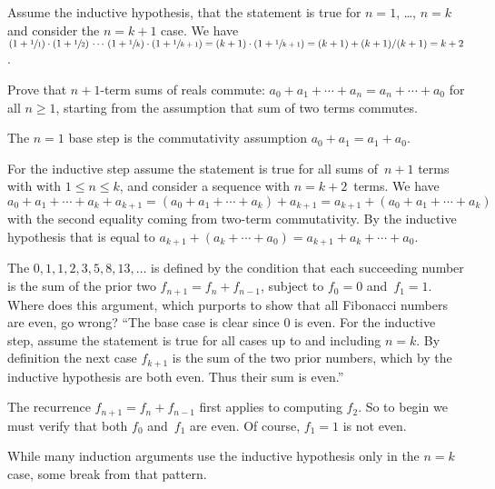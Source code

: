 \documentclass{ibl}  %
\begin{document}
\begin{problem}
\begin{exes}
\begin{answer}
  Assume the inductive hypothesis, that the statement is true for
  $n=1$, \ldots, $n=k$ and consider the $n=k+1$ case.
  We have
  $(1+\sfrac{1}{1})\cdot(1+\sfrac{1}{2})\,\cdots\,(1+\sfrac{1}{k})\cdot(1+\sfrac{1}{k+1})
  =
  (k+1)\cdot(1+\sfrac{1}{k+1})
  =(k+1)+(k+1)/(k+1)
  =k+2$.  
\end{answer}
\end{exes}
\end{problem}

\begin{problem}[\midlength]
Prove that $n+1$-term sums of reals commute:
$a_0+a_1+\cdots+a_n=a_n+\cdots+a_0$ for all $n\geq 1$,
starting from the assumption that sum of two terms commutes.
\begin{answer}
The $n=1$ base step is the commutativity assumption $a_0+a_1=a_1+a_0$.

For the inductive step assume the statement is true for all 
sums of~$n+1$ terms with 
with $1\leq n\leq k$, and consider a sequence with $n=k+2$~terms.
We have 
$a_0+a_1+\cdots+a_k+a_{k+1}
=(a_0+a_1+\cdots+a_k)+a_{k+1}
=a_{k+1}+(a_0+a_1+\cdots+a_k)$ with the second equality coming from
two-term commutativity.
By the inductive hypothesis that is equal to 
$a_{k+1}+(a_k+\cdots+a_0)=a_{k+1}+a_k+\cdots+a_0$.
\end{answer}
\end{problem}

\begin{problem}[\maxlength]
The 
$0,1,1,2,3,5,8,13, \ldots$ is defined by the condition that 
each succeeding number is the sum of the 
prior two $f_{n+1}=f_n+f_{n-1}$, subject to 
$f_0=0$ and~$f_1=1$.
Where does this argument, which purports to show that
all Fibonacci numbers are even, go wrong?
``The base case is clear since $0$ is even.  
For the inductive step, assume the statement 
is true for all cases up to and including $n=k$.
By definition 
the next case $f_{k+1}$ is the sum of the two prior numbers, which by
the inductive hypothesis are both even.  
Thus their sum is even.''   
\begin{answer}
The recurrence $f_{n+1}=f_n+f_{n-1}$ first applies to computing $f_2$.
So to begin we must verify that both $f_0$ and~$f_1$ are even.
Of course, $f_1=1$ is not even.
\end{answer}
\end{problem}

While many induction arguments use the inductive 
hypothesis only in the $n=k$ case,
some break from that pattern.
\end{document}
